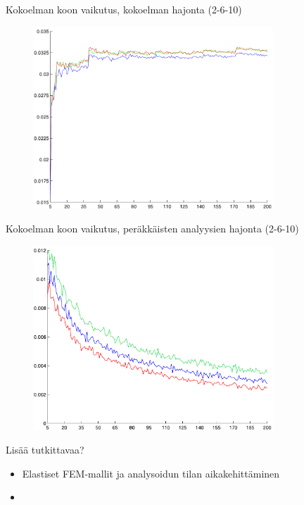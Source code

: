 \documentclass{beamer}
\begin{document}
\begin{frame}{Kokoelman koon vaikutus, kokoelman hajonta (2-6-10)}

\begin{figure}
\includegraphics[width=9cm]{ensemble_stdev.pdf}
\end{figure}

\end{frame}

\begin{frame}{Kokoelman koon vaikutus, peräkkäisten analyysien hajonta (2-6-10)}

\begin{figure}
\includegraphics[width=9cm]{stdev_between_analysis.pdf}
\end{figure}

\end{frame}

\begin{frame}{Lisää tutkittavaa?}

\begin{itemize}
\item Elastiset FEM-mallit ja analysoidun tilan aikakehittäminen
\item   
\end{itemize}

\end{frame}
\end{document}
